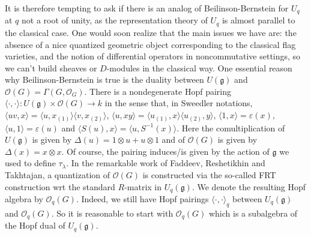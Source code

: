 \documentclass[11pt, a4paper]{article}
\theoremstyle{definition}
\newcommand{\ve}[0]{\varepsilon}
\newcommand{\D}[0]{\Delta}
\newcommand{\g}{\mathfrak g}
\begin{document}
    It is therefore tempting to ask if there is an analog of Beilinson-Bernstein for $U_q$ at $q$ not a root of unity, as the representation theory of $U_q$ is almost parallel to the classical case. One would soon realize that the main issues we have are: the absence of a nice quantized geometric object corresponding to the classical flag varieties, and the notion of differential operators in noncommutative settings, so we can't build sheaves or $D$-modules in the classical way. One essential reason why Beilinson-Bernstein is true is the duality between $U(\g)$ and $\mathcal O(G)=\Gamma(G, \mathcal O_G)$. There is a nondegenerate Hopf pairing $\langle\cdot,\cdot\rangle:U(\g)\times\mathcal O(G)\to k$ in the sense that, in Sweedler notations, $\langle uv, x\rangle=\langle u, x_{(1)}\rangle\langle v, x_{(2)}\rangle$, $\langle u, xy\rangle=\langle u_{(1)}, x\rangle\langle u_{(2)}, y\rangle$, $\langle 1, x\rangle=\ve(x)$, $\langle u, 1\rangle=\ve(u)$ and $\langle S(u), x\rangle=\langle u, S^{-1}(x)\rangle$. Here the comultiplication of $U(\g)$ is given by $\D(u)=1\otimes u+u\otimes 1$ and of $\mathcal O(G)$ is given by $\D(x)=x\otimes x$. Of course, the pairing induces/is given by the action of $\g$ we used to define $\tau_\lambda$. In the remarkable work \cite{FADDEEV1988129} of Faddeev, Reshetikhin and Takhtajan, a quantization of $\mathcal O(G)$ is constructed via the so-called FRT construction wrt the standard $R$-matrix in $U_q(\g)$. We denote the resulting Hopf algebra by $\mathcal O_q(G)$. Indeed, we still have Hopf pairings $\langle\cdot,\cdot\rangle_q$ between $U_q(\g)$ and $\mathcal O_q(G)$. So it is reasonable to start with $\mathcal O_q(G)$ which is a subalgebra of the Hopf dual of $U_q(\g)$.
    
\end{document}
